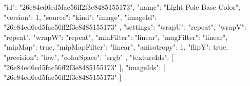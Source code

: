 {
  "id": "26e84ed6ed5fac56ff2f3e8485155173",
  "name": "Light Pole Base Color",
  "version": 1,
  "source": {
    "kind": "image",
    "imageId": "26e84ed6ed5fac56ff2f3e8485155173"
  },
  "settings": {
    "wrapU": "repeat",
    "wrapV": "repeat",
    "wrapW": "repeat",
    "minFilter": "linear",
    "magFilter": "linear",
    "mipMap": true,
    "mipMapFilter": "linear",
    "anisotropy": 1,
    "flipY": true,
    "precision": "low",
    "colorSpace": "srgb"
  },
  "textureIds": [
    "26e84ed6ed5fac56ff2f3e8485155173"
  ],
  "imageIds": [
    "26e84ed6ed5fac56ff2f3e8485155173"
  ]
}
